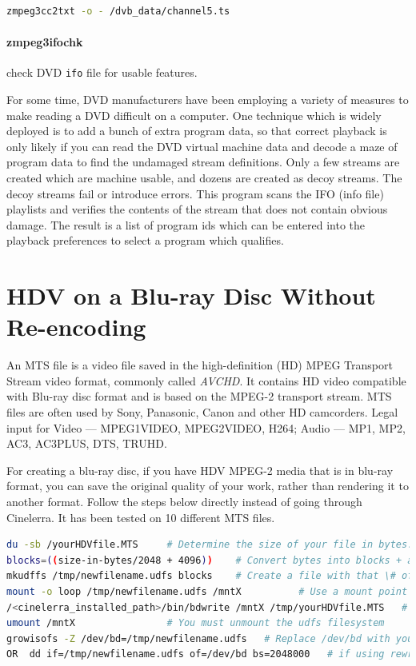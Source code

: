 \begin{lstlisting}[language=bash,numbers=none]
zmpeg3cc2txt -o - /dvb_data/channel5.ts
\end{lstlisting}

\paragraph{zmpeg3ifochk} check DVD \texttt{ifo} file for usable features.

For some time, DVD manufacturers have been employing  a variety of measures to make reading a DVD difficult on a computer.  One technique which is widely deployed is to add a bunch of extra program data, so that correct playback is only likely if you can read the DVD virtual machine data and decode a maze of program data to find the undamaged stream definitions.  Only a few streams are created which are machine usable, and dozens are created as decoy streams.  The decoy streams fail or introduce errors.  This program scans the IFO (info file) playlists and verifies the contents of the stream that does not contain obvious damage.  The result is a list of program ids which can be entered into the playback preferences to select a program which qualifies.

\section{HDV on a Blu-ray Disc Without Re-encoding}%
\label{sec:hdv_bd_without_reencoding}

An MTS file is a video file saved in the high-definition (HD) MPEG Transport Stream video format, commonly called \textit{AVCHD}.  It contains HD video compatible with Blu-ray disc format and is based on the MPEG-2 transport stream.   MTS files are often used by Sony, Panasonic, Canon and other HD camcorders.  Legal input for Video --- MPEG1VIDEO, MPEG2VIDEO, H264; Audio --- MP1, MP2, AC3, AC3PLUS, DTS, TRUHD. 

For creating a blu-ray disc, if you have HDV MPEG-2 media that is in blu-ray format, you can save the original quality of your work, rather than rendering it to another format.  Follow the steps below directly instead of going through Cinelerra.  It has been tested on 10 different MTS files.

\begin{lstlisting}[language=bash,numbers=none]
du -sb /yourHDVfile.MTS		# Determine the size of your file in bytes.
blocks=((size-in-bytes/2048 + 4096))	# Convert bytes into blocks + a little more.	
mkudffs /tmp/newfilename.udfs blocks	# Create a file with that \# of blocks + some extra.
mount -o loop /tmp/newfilename.udfs /mntX          # Use a mount point like mntX that is not in use.
/<cinelerra_installed_path>/bin/bdwrite /mntX /tmp/yourHDVfile.MTS   # Substitute Cinelerra path.
umount /mntX				# You must unmount the udfs filesystem
growisofs -Z /dev/bd=/tmp/newfilename.udfs   # Replace /dev/bd with your bluray hardware device.
OR  dd if=/tmp/newfilename.udfs of=/dev/bd bs=2048000   # if using rewritable blu-ray; replace bd.
\end{lstlisting}

